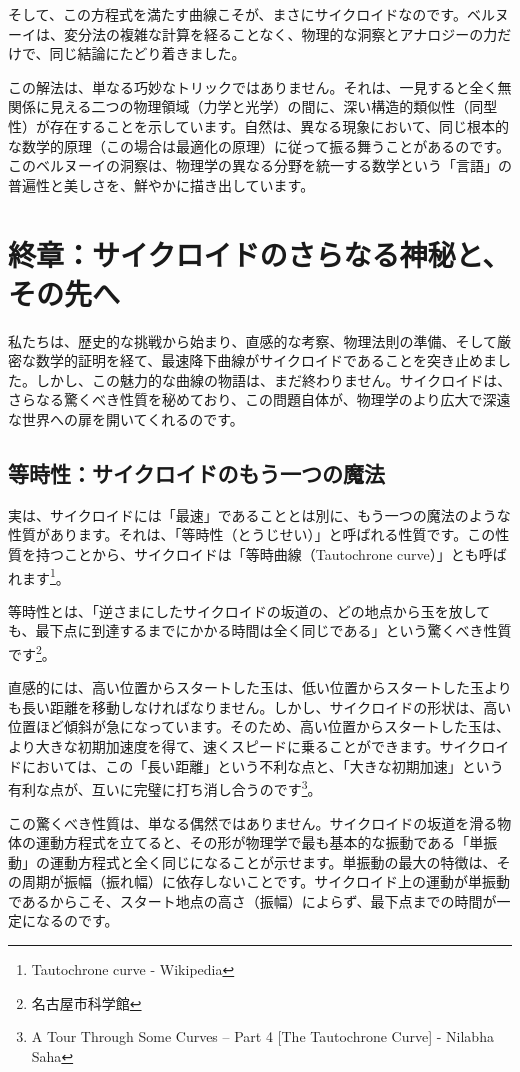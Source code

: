 \documentclass[a4paper,12pt]{bxjsarticle}
\begin{document}
そして、この方程式を満たす曲線こそが、まさにサイクロイドなのです。ベルヌーイは、変分法の複雑な計算を経ることなく、物理的な洞察とアナロジーの力だけで、同じ結論にたどり着きました。

この解法は、単なる巧妙なトリックではありません。それは、一見すると全く無関係に見える二つの物理領域（力学と光学）の間に、深い構造的類似性（同型性）が存在することを示しています。自然は、異なる現象において、同じ根本的な数学的原理（この場合は最適化の原理）に従って振る舞うことがあるのです。このベルヌーイの洞察は、物理学の異なる分野を統一する数学という「言語」の普遍性と美しさを、鮮やかに描き出しています。

\section{終章：サイクロイドのさらなる神秘と、その先へ}

私たちは、歴史的な挑戦から始まり、直感的な考察、物理法則の準備、そして厳密な数学的証明を経て、最速降下曲線がサイクロイドであることを突き止めました。しかし、この魅力的な曲線の物語は、まだ終わりません。サイクロイドは、さらなる驚くべき性質を秘めており、この問題自体が、物理学のより広大で深遠な世界への扉を開いてくれるのです。

\subsection{等時性：サイクロイドのもう一つの魔法}

実は、サイクロイドには「最速」であることとは別に、もう一つの魔法のような性質があります。それは、「等時性（とうじせい）」と呼ばれる性質です。この性質を持つことから、サイクロイドは「等時曲線（Tautochrone curve）」とも呼ばれます\footnote{Tautochrone curve - Wikipedia}。

等時性とは、「逆さまにしたサイクロイドの坂道の、どの地点から玉を放しても、最下点に到達するまでにかかる時間は全く同じである」という驚くべき性質です\footnote{名古屋市科学館}。

直感的には、高い位置からスタートした玉は、低い位置からスタートした玉よりも長い距離を移動しなければなりません。しかし、サイクロイドの形状は、高い位置ほど傾斜が急になっています。そのため、高い位置からスタートした玉は、より大きな初期加速度を得て、速くスピードに乗ることができます。サイクロイドにおいては、この「長い距離」という不利な点と、「大きな初期加速」という有利な点が、互いに完璧に打ち消し合うのです\footnote{A Tour Through Some Curves – Part 4 [The Tautochrone Curve] - Nilabha Saha}。

この驚くべき性質は、単なる偶然ではありません。サイクロイドの坂道を滑る物体の運動方程式を立てると、その形が物理学で最も基本的な振動である「単振動」の運動方程式と全く同じになることが示せます。単振動の最大の特徴は、その周期が振幅（振れ幅）に依存しないことです。サイクロイド上の運動が単振動であるからこそ、スタート地点の高さ（振幅）によらず、最下点までの時間が一定になるのです。
\end{document}
